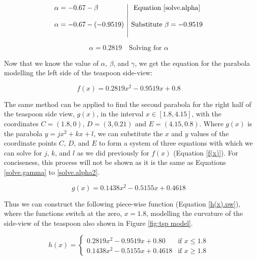 \documentclass[12pt]{article}
\begin{document}
$$
\begin{array}{l|c}
    \alpha = -0.67 - \beta & \text{Equation \ref{solve.alpha}}\\ \\
    \alpha = -0.67 -(-0.9519) & \text{Substitute } \beta =-0.9519 \\ \\
 \end{array} 
$$

\begin{equation}\label{solve.alpha2}
    \boxed{ \alpha = 0.2819}  \quad \text{Solving for } \alpha
\end{equation}

Now that we know the value of $\alpha$, $\beta$, and $\gamma$, we get the equation for the parabola modelling the left side of the teaspoon side-view:

\begin{equation}\label{f(x)}
    \boxed{f(x)=0.2819x^2 -0.9519x +0.8}
\end{equation}

The same method can be applied to find the second parabola for the right half of the teaspoon side view, $g(x)$, in the interval $x \in [1.8, 4.15]$, with the coordinates $C = (1.8,0)$, $D= (3,0.21)$ and $E=(4.15,0.8)$. Where $g(x)$ is the parabola $y=jx^2+kx+l$, we can substitute the $x$ and $y$ values of the coordinate points $C$, $D$, and $E$ to form a system of three equations with which we can solve for $j$, $k$, and $l$ as we did previously for $f(x)$ (Equation \ref{f(x)}). For conciseness, this process will not be shown as it is the same as Equations \ref{solve.gamma} to \ref{solve.alpha2}.

\vspace{-5mm}

\begin{equation}\label{g(x)}
    \boxed{g(x)= 0.1438x^2 -0.5155x + 0.4618}
\end{equation}

Thus we can construct the following piece-wise function (Equation \ref{h(x).pw}), where the functions switch at the zero, $x=1.8$, modelling the curvature of the side-view of the teaspoon also shown in Figure \ref{fig:tsp model}.

\begin{equation}\label{h(x).pw}
    h(x)=
    \begin{cases}
        0.2819x^2 - 0.9519x + 0.80 & \text{if } x \le 1.8 \\
        0.1438x^2 - 0.5155x + 0.4618 & \text{if } x \ge 1.8
    \end{cases}
\end{equation}
\end{document}
